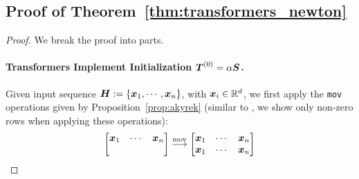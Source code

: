 \subsection{Proof of Theorem~\ref{thm:transformers_newton}}
\TransformersNewton*
\begin{proof} We break the proof into parts.

\paragraph{Transformers Implement Initialization $\boldsymbol{T}^{(0)}  = \alpha \boldsymbol{S}$.} 
Given input sequence $\boldsymbol{H} := \{\boldsymbol{x}_1, \cdots, \boldsymbol{x}_n\}$, with $\boldsymbol{x}_i \in \mathbb R^d$,  we first apply the \verb|mov| operations given by Proposition~\ref{prop:akyrek} (similar to \cite{Akyrek2022WhatLA}, we show only non-zero rows when applying these operations):
\begin{equation}
    \begin{bmatrix}
        \boldsymbol{x}_1 & \cdots & \boldsymbol{x}_n \\
        & & 
    \end{bmatrix} \overset{\mathrm{mov}}{\longrightarrow} \begin{bmatrix}
        \boldsymbol{x}_1 & \cdots & \boldsymbol{x}_n  \\
        \boldsymbol{x}_1 & \cdots & \boldsymbol{x}_n 
    \end{bmatrix}
\end{equation}




\end{proof}
